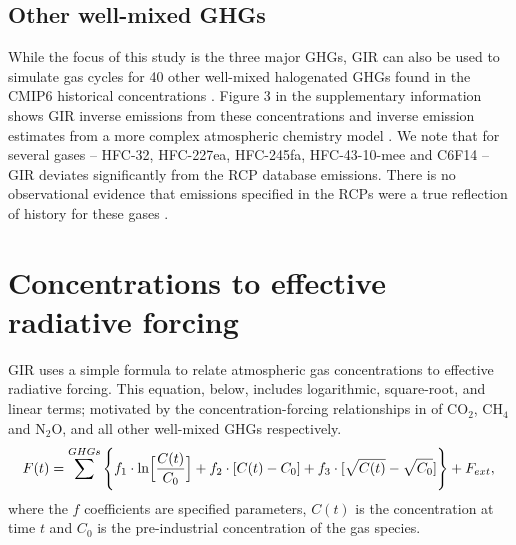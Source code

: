 \documentclass[gmd, manuscript]{copernicus}
\begin{document}
\subsection*{Other well-mixed GHGs}
While the focus of this study is the three major GHGs, GIR can also be used to simulate gas cycles for 40 other well-mixed halogenated GHGs found in the CMIP6 historical concentrations \citep{Meinshausen2017}. Figure 3 in the supplementary information shows GIR inverse emissions from these concentrations and inverse emission estimates from a more complex atmospheric chemistry model \citep{Cunnold1994,Rigby2011,Rigby2014,Engel2018,Prinn2018}. We note that for several gases -- HFC-32, HFC-227ea, HFC-245fa, HFC-43-10-mee and C6F14 -- GIR deviates significantly from the RCP database emissions. There is no observational evidence that emissions specified in the RCPs were a true reflection of history for these gases \citep{Vollmer2011,Ivy2012,Odoherty2014}.

\section{Concentrations to effective radiative forcing}
GIR uses a simple formula to relate atmospheric gas concentrations to effective radiative forcing. This equation, below, includes logarithmic, square-root, and linear terms; motivated by the concentration-forcing relationships in \cite{Myhre2013a} of CO$_2$, CH$_4$ and N$_2$O, and all other well-mixed GHGs respectively.
\begin{equation}
    F(t) = \sum^{GHGs} \Bigg\{ f_1 \cdot \text{ln}\Big[\frac{C(t)}{C_0}\Big] + f_2 \cdot [C(t) - C_0] + f_3 \cdot[\sqrt{C(t)} - \sqrt{C_0}] \Bigg\} + F_{ext}, \label{eq_forc}\\
\end{equation}
where the $f$ coefficients are specified parameters, $C(t)$ is the concentration at time $t$ and $C_0$ is the pre-industrial concentration of the gas species.
\end{document}
